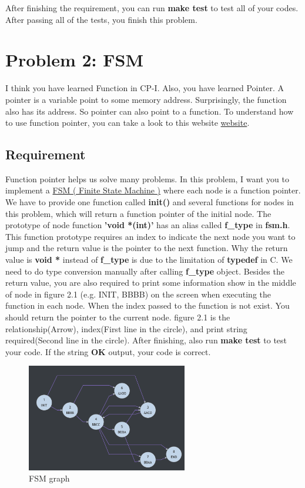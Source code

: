 \documentclass{report}
\begin{document}
After finishing the requirement, you can run \textbf{make test} to test all of
your codes.
After passing all of the tests, you finish this problem.

\section{Problem 2: FSM}

I think you have learned Function in CP-I. Also, you have learned Pointer. A
pointer is a variable point to some memory address.
Surprisingly, the function also has its address. So pointer can also point to a
function.
To understand how to use function pointer, you can take a look to this website
\href{https://chenhh.gitbooks.io/parallel_processing/content/cython/function_pointer.html}{website}.

\subsection{Requirement}

Function pointer helps us solve many problems. In this problem, I want you to implement a
\href{https://zh.wikipedia.org/zh-tw/%E6%9C%89%E9%99%90%E7%8A%B6%E6%80%81%E6%9C%BA}{FSM
  ( Finite State Machine )} where each node is a function pointer.
We have to provide one function called \textbf{init()} and several functions for
nodes in this problem, which will return a function pointer of the initial node. The prototype of node function
\textbf{'void *(int)'} has an alias called \textbf{f\_type} in
\textbf{fsm.h}. This function prototype requires an index to indicate the next
node you want to jump and the return
value is the pointer to the next function. Why the return value is \textbf{void *}
instead of \textbf{f\_type} is due to the limitation of \textbf{typedef} in C.
We need to do type conversion manually after calling \textbf{f\_type} object.
Besides the return value, you are also required to print some information show
in the middle of node in figure 2.1 (e.g. INIT, BBBB) on the
screen when executing the function in each node. When the index passed to the
function is not exist. You should return the pointer to the current node.
figure 2.1 is the relationship(Arrow), index(First line in the circle),
and print string required(Second line in the circle). After
finishing, also run \textbf{make test} to test your code. If the string \textbf{OK} output,
your code is correct.


\begin{figure}
\centering
\includegraphics[width=70mm]{graph}
\caption{FSM graph}
\label{fig:FSM}

\end{figure}
\end{document}
